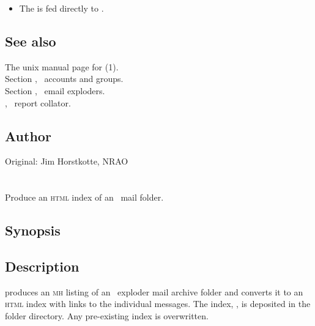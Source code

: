 \begin{itemize}
\item
   The  is fed directly to .
\end{itemize}

\subsection*{See also}
 
The unix manual page for (1).\\
Section , \aipspp\ accounts and groups.\\
Section , \aipspp\ email exploders.\\
, \aipspp\ report collator.
 
\subsection*{Author}
 
Original: Jim Horstkotte, NRAO
 

\newpage
\section{}
\label{scanhtml}

Produce an \textsc{html} index of an \aipspp\ mail folder.

\subsection*{Synopsis}

\begin{synopsis}
\end{synopsis}

\subsection*{Description}

 produces an \textsc{mh}  listing of an \aipspp\
exploder mail archive folder and converts it to an \textsc{html} index with
links to the individual messages.  The index, \file{index.html}, is deposited
in the folder directory.  Any pre-existing index is overwritten.

